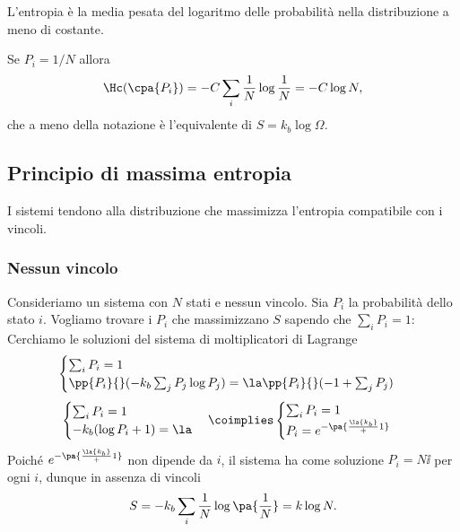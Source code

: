 \begin{remark}
L'entropia \`e la media pesata del logaritmo delle probabilit\`a nella distribuzione a meno di costante.
\end{remark}

\begin{remark}
Se $P_i=1/N$ allora \[\Hc(\cpa{P_i})=-C\sum_i \frac1N\log\frac1N=-C\log N,\]
che a meno della notazione \`e l'equivalente di $S=k_b\log \Omega$.
\end{remark}


\subsection{Principio di massima entropia}
\begin{fact}
I sistemi tendono alla distribuzione che massimizza l'entropia compatibile con i vincoli.
\end{fact}

\subsubsection{Nessun vincolo}
Consideriamo un sistema con $N$ stati e nessun vincolo. Sia $P_i$ la probabilit\`a dello stato $i$. Vogliamo trovare i $P_i$ che massimizzano $S$ sapendo che $\sum_i P_i=1$:\\
Cerchiamo le soluzioni del sistema di moltiplicatori di Lagrange
\[\begin{cases}
\sum_i P_i=1\\
\pp{P_i}{}(-k_b\sum_j P_j\log P_j)=\la \pp{P_i}{}(-1+\sum_j P_j)
\end{cases}\]
\[\begin{cases}
\sum_i P_i=1\\
-k_b (\log P_i+1)=\la
\end{cases}\coimplies\begin{cases}
\sum_i P_i=1\\
P_i=e^{-\pa{\frac \la{k_b}+1}}
\end{cases}\]
Poich\'e $e^{-\pa{\frac \la{k_b}+1}}$ non dipende da $i$, il sistema ha come soluzione $P_i=N\ii$ per ogni $i$, dunque in assenza di vincoli
\[S=-k_b\sum_i\frac1N\log\pa{\frac1N}=k\log N.\]

